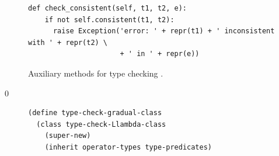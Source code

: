 \documentclass[7x10]{TimesAPriori_MIT}%
\def\racketEd{0}
\def\edition{0}
\numberwithin{theorem}{chapter}
\numberwithin{definition}{chapter}
\numberwithin{equation}{chapter}
\begin{document}
{\begin{figure}[tbp]
\begin{tcolorbox}[colback=white]
\begin{lstlisting}[basicstyle=\ttfamily\scriptsize]
  def check_consistent(self, t1, t2, e):
    if not self.consistent(t1, t2):
      raise Exception('error: ' + repr(t1) + ' inconsistent with ' + repr(t2) \
                      + ' in ' + repr(e))

\end{lstlisting}
\end{tcolorbox}

\caption{Auxiliary methods for type checking \LangGrad{}.}
\label{fig:type-check-Lgradual-aux}
\end{figure}

\fi}


{\if\edition\racketEd        
\begin{figure}[tbp]
\begin{tcolorbox}[colback=white]  
\begin{lstlisting}[basicstyle=\ttfamily\scriptsize]
(define type-check-gradual-class
  (class type-check-Llambda-class
    (super-new)
    (inherit operator-types type-predicates)


\end{lstlisting}
\end{tcolorbox}
\end{figure}}
\end{document}
